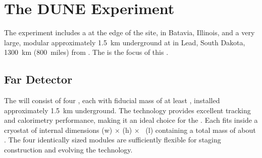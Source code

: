 \section{The DUNE Experiment}

The  experiment includes a  at the edge of the  site, in Batavia, Illinois, and a very large, modular  approximately \SI{1.5}{km} underground at  in Lead, South Dakota, \SI{1300}{km} (\SI{800}{miles}) from . The   is the focus of this . 



\subsection{Far Detector}
\label{ch:dune-det-tech-ov-fd}

The \fdfiducialmass {}  will consist of four  , each with fiducial mass of at least \nominalmodsize, installed approximately \SI{1.5}{km} underground. The  technology provides
excellent tracking and calorimetry performance, making it an ideal
choice for the  . Each  fits inside a cryostat of internal dimensions
\cryostatwdth (w) $\times$ \cryostatht (h) $\times$ \cryostatlen~(l) containing a total  mass of about \larmass{}.
 The four identically sized modules are sufficiently flexible for staging construction and  evolving the  technology.

